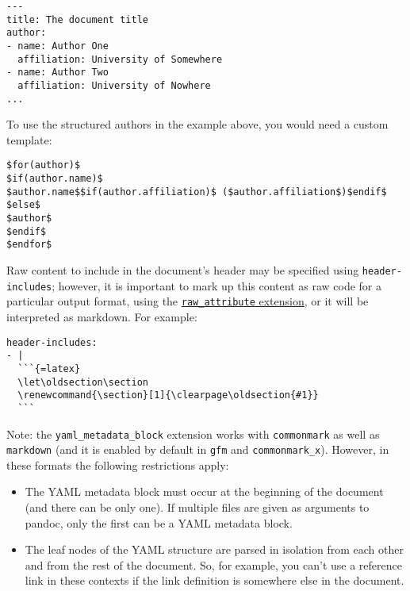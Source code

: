 \documentclass[
]{article}
\begin{document}
\begin{verbatim}
---
title: The document title
author:
- name: Author One
  affiliation: University of Somewhere
- name: Author Two
  affiliation: University of Nowhere
...
\end{verbatim}

To use the structured authors in the example above, you would need a
custom template:

\begin{verbatim}
$for(author)$
$if(author.name)$
$author.name$$if(author.affiliation)$ ($author.affiliation$)$endif$
$else$
$author$
$endif$
$endfor$
\end{verbatim}

Raw content to include in the document's header may be specified using
\texttt{header-includes}; however, it is important to mark up this
content as raw code for a particular output format, using the
\hyperref[extension-raw_attribute]{\texttt{raw\_attribute} extension},
or it will be interpreted as markdown. For example:

\begin{verbatim}
header-includes:
- |
  ```{=latex}
  \let\oldsection\section
  \renewcommand{\section}[1]{\clearpage\oldsection{#1}}
  ```
\end{verbatim}

Note: the \texttt{yaml\_metadata\_block} extension works with
\texttt{commonmark} as well as \texttt{markdown} (and it is enabled by
default in \texttt{gfm} and \texttt{commonmark\_x}). However, in these
formats the following restrictions apply:

\begin{itemize}
\item
  The YAML metadata block must occur at the beginning of the document
  (and there can be only one). If multiple files are given as arguments
  to pandoc, only the first can be a YAML metadata block.
\item
  The leaf nodes of the YAML structure are parsed in isolation from each
  other and from the rest of the document. So, for example, you can't
  use a reference link in these contexts if the link definition is
  somewhere else in the document.
\end{itemize}
\end{document}
